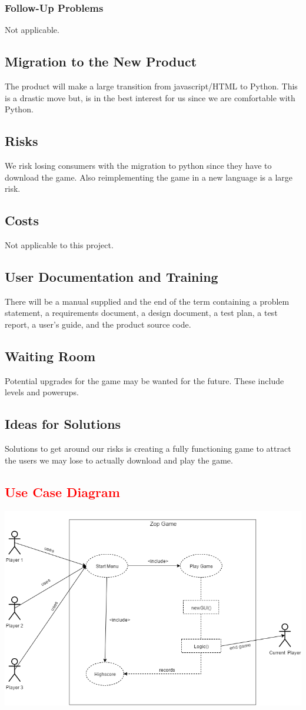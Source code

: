 \documentclass[12pt]{article}
\begin{document}
\subsubsection{Follow-Up Problems}
Not applicable.

\subsection{Migration to the New Product}
The product will make a large transition from javascript/HTML to Python.  This is a drastic move but, is in the best interest for us since we are comfortable with Python.
\subsection{Risks}
We risk losing consumers with the migration to python since they have to download the game. Also reimplementing the game in a new language is a large risk.
\subsection{Costs}
Not applicable to this project.
\subsection{User Documentation and Training}
There will be a manual supplied and the end of the term containing a problem statement, a requirements document, a design document, a test plan, a test
report, a user's guide, and the product source code.
\subsection{Waiting Room}
Potential upgrades for the game may be wanted for the future.  These include levels and powerups.
\subsection{Ideas for Solutions}
Solutions to get around our risks is creating a fully functioning game to attract the users we may lose to actually download and play the game.
\newpage
\textcolor{red}{\section{Use Case Diagram}}
\includegraphics[scale=0.69]{usecase}
\end{document}
